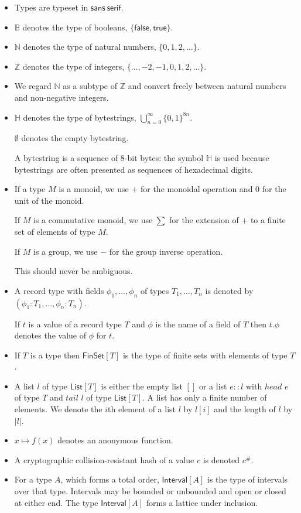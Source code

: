 \documentclass[a4paper]{article}
\newcounter{note}
\newcommand{\s}{\textsf}  %
\newcommand{\true}{\textsf{true}}
\newcommand{\false}{\textsf{false}}
\newcommand{\hash}[1]{\ensuremath{#1^{\#}}}
\newcommand{\List}[1]{\ensuremath{\s{List}[#1]}}
\newcommand{\FinSet}[1]{\ensuremath{\s{FinSet}[#1]}}
\newcommand{\Interval}[1]{\ensuremath{\s{Interval}[#1]}}
\newcommand\B{\ensuremath{\mathbb{B}}}
\newcommand\N{\ensuremath{\mathbb{N}}}
\newcommand\Z{\ensuremath{\mathbb{Z}}}
\renewcommand\H{\ensuremath{\mathbb{H}}}
\newcommand{\emptyBs}{\ensuremath{\emptyset}}
\begin{document}
\begin{itemize}
\item Types are typeset in $\mathsf{sans~serif}$.

\item \B{} denotes the type of booleans, $\{\false, \true\}$.
\item \N{} denotes the type of natural numbers, $\{0, 1, 2, \ldots\}$.
\item \Z{} denotes the type of integers, $\{\ldots, -2, -1, 0, 1, 2, \ldots\}$.
\item We regard $\N$ as a subtype of $\Z$ and convert freely between
  natural numbers and non-negative integers.
\item \H{} denotes the type of bytestrings,
  $\bigcup_{n=0}^{\infty}\{0,1\}^{8n}$.

  \emptyBs{} denotes the empty bytestring.

  A bytestring is a sequence of 8-bit bytes: the symbol $\H$ is used because bytestrings are often
  presented as sequences of hexadecimal digits.

\item If a type $M$ is a monoid, we use $+$ for the monoidal operation and $0$
  for the unit of the monoid.

  If $M$ is a commutative monoid, we use $\sum$ for the extension of $+$ to a finite set of elements of
  type $M$.

  If $M$ is a group, we use $-$ for the group
  inverse operation.

  This should never be ambiguous.

\item A record type with fields $\phi_1, \ldots, \phi_n$ of types $T_1,
  \ldots, T_n$ is denoted by $(\phi_1 : T_1, \ldots, \phi_n : T_n)$.

  If $t$ is a value of a record type $T$ and $\phi$ is the name
  of a field of $T$ then $t.\phi$ denotes the value of $\phi$ for
  $t$.

\item If $T$ is a type then $\FinSet{T}$ is the type of finite sets
  with elements of type $T$.

\item A list $l$ of type $\List{T}$ is either the empty list
  $[]$ or a list $e :: l$ with $head$ $e$ of type $T$ and
  $tail$ $l$ of type $\List{T}$. A list has only a finite
  number of elements.  We denote the $i$th element of a list $l$ by
  $l[i]$ and the length of $l$ by $\left|l\right|$.

\item $x \mapsto f(x)$ denotes an anonymous function.

\item A cryptographic collision-resistant hash of a value $c$ is denoted $\hash{c}$.

\item For a type $A$, which forms a total order, $\Interval{A}$ is the
  type of intervals over that type. Intervals may be bounded or
  unbounded and open or closed at either end. The type $\Interval{A}$
  forms a lattice under inclusion.
\end{itemize}
\end{document}
